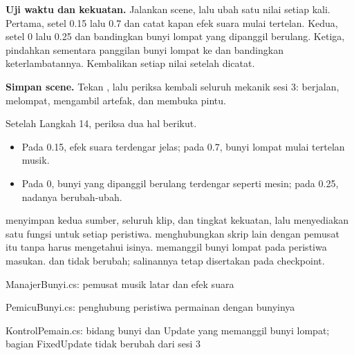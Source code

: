\begin{langkah}
  \item \textbf{Uji waktu dan kekuatan.} Jalankan scene, lalu ubah satu nilai
        setiap kali. Pertama, setel  0.15 lalu 0.7 dan
        catat kapan efek suara mulai tertelan. Kedua, setel
         0 lalu 0.25 dan bandingkan bunyi lompat yang
        dipanggil berulang. Ketiga, pindahkan sementara panggilan bunyi lompat
        ke  dan bandingkan keterlambatannya. Kembalikan
        setiap nilai setelah dicatat.

  \item \textbf{Simpan scene.} Tekan , lalu periksa kembali
        seluruh mekanik sesi 3: berjalan, melompat, mengambil artefak, dan
        membuka pintu.
\end{langkah}

\begin{ujibox}
Setelah Langkah 14, periksa dua hal berikut.
\begin{itemize}[leftmargin=1.4em, itemsep=0.2em]
  \item Pada  0.15, efek suara terdengar jelas; pada 0.7,
        bunyi lompat mulai tertelan musik.
  \item Pada  0, bunyi yang dipanggil berulang terdengar
        seperti mesin; pada 0.25, nadanya berubah-ubah.
\end{itemize}
\end{ujibox}


 menyimpan kedua sumber, seluruh klip, dan tingkat kekuatan,
lalu menyediakan satu fungsi untuk setiap peristiwa. 
menghubungkan skrip lain dengan pemusat itu tanpa harus mengetahui isinya.
 memanggil bunyi lompat pada peristiwa masukan.
 dan  tidak berubah; salinannya tetap
disertakan pada checkpoint.

  {ManajerBunyi.cs: pemusat musik latar dan efek suara}

  {PemicuBunyi.cs: penghubung peristiwa permainan dengan bunyinya}

  {KontrolPemain.cs: bidang bunyi dan Update yang memanggil bunyi lompat;
   bagian FixedUpdate tidak berubah dari sesi 3}

